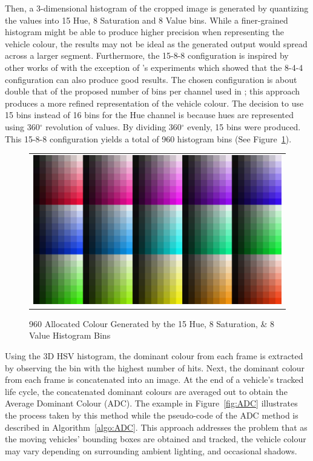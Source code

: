 Then, a 3-dimensional histogram of the cropped image is generated by quantizing the values into 15 Hue, 8 Saturation and 8 Value bins.
While a finer-grained histogram might be able to produce higher precision when representing the vehicle colour, the results may not be ideal as the generated output would spread across a larger segment.
Furthermore, the 15-8-8 configuration is inspired by other works of \cite{kim2008deciding, castanon2016retrieval} with the exception of 's experiments which showed that the 8-4-4 configuration can also produce good results.
The chosen configuration is about double that of the proposed number of bins per channel used in \cite{kim2008deciding}; this approach produces a more refined representation of the vehicle colour.
The decision to use 15 bins instead of 16 bins for the Hue channel is because hues are represented using 360$^{\circ}$ revolution of values. By dividing 360$^{\circ}$ evenly, 15 bins were produced.
This 15-8-8 configuration yields a total of 960 histogram bins (See Figure~\ref{fig:hsvAllocated}).

\begin{figure}[htb!]
  \centering
\begin{tabular}{c}
 \includegraphics[width=0.7\linewidth]{image/retrievalOne/all.png} \\
\end{tabular}
    \caption{960 Allocated Colour Generated by the 15 Hue, 8 Saturation, \& 8 Value Histogram Bins} \label{fig:hsvAllocated}
\end{figure}

Using the 3D HSV histogram, the dominant colour from each frame is extracted by observing the bin with the highest number of hits. Next, the dominant colour from each frame is concatenated into an image. At the end of a vehicle's tracked life cycle, the concatenated dominant colours are averaged out to obtain the Average Dominant Colour (ADC). The example in Figure~\ref{fig:ADC} illustrates the process taken by this method while the pseudo-code of the ADC method is described in Algorithm~\ref{algo:ADC}.
This approach addresses the problem that as the moving vehicles' bounding boxes are obtained and tracked, the vehicle colour may vary depending on surrounding ambient lighting, and occasional shadows. 

